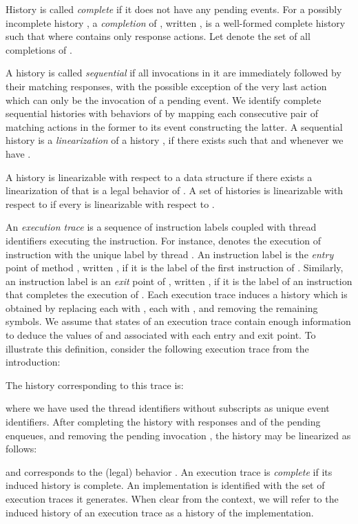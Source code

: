 \documentclass{LMCS}
\begin{document}
History  is called {\em complete} if it does not have any pending events.
For a possibly incomplete history , a {\em completion} of , written , is a well-formed complete history such that  where  contains only response actions.
Let  denote the set of all completions of .

A history is called {\em sequential} if all invocations in it are immediately followed by their matching responses, with the possible exception of the very last action which can only be the invocation of a pending event.
We identify complete sequential histories with behaviors of  by mapping each consecutive pair of matching actions in the former to its event constructing the latter.
A sequential history  is a {\em linearization} of a history , if there exists  such that  and whenever  we have .

\begin{defi}
A history  is linearizable with respect to a data structure  if
there exists a linearization of  that is a legal behavior of .
A set of histories  is linearizable with respect to  if 
every  is linearizable with respect to .
\end{defi}
An {\em execution trace} is a sequence of instruction labels coupled with thread identifiers executing the instruction.
For instance,  denotes the execution of instruction with the unique label  by thread .
An instruction label is the {\em entry} point of method , written , if it is the label of the first instruction of .
Similarly, an instruction label is an {\em exit} point of , written , if it is the label of an instruction that completes the execution of . 
Each execution trace  induces a history  which is obtained by replacing each  with , each  with , and removing the remaining symbols.
We assume that states of an execution trace contain enough information to deduce the values of  and  associated with each entry and exit point. 
To illustrate this definition, consider the following execution trace from the introduction:

The history corresponding to this trace is:

where we have used the thread identifiers without subscripts as unique event identifiers.
After completing the history with responses  and  of the pending enqueues, 
and removing the pending invocation , the history may be linearized as follows:

and corresponds to the (legal) behavior
.
An execution trace is {\em complete} if its induced history is complete.
An implementation is identified with the set of execution traces it generates. 
When clear from the context, we will refer to the induced history of an execution trace as a history of the implementation.
\end{document}
